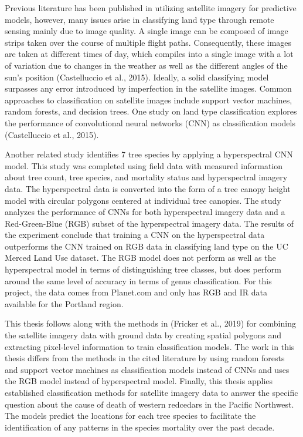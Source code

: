 \documentclass[12pt,twoside]{reedthesis}
\begin{document}
Previous literature has been published in utilizing satellite imagery for predictive models, however, many issues arise in classifying land type through remote sensing mainly due to image quality. A single image can be composed of image strips taken over the course of multiple flight paths. Consequently, these images are taken at different times of day, which compiles into a single image with a lot of variation due to changes in the weather as well as the different angles of the sun's position (Castelluccio et al., 2015). Ideally, a solid classifying model surpasses any error introduced by imperfection in the satellite images. Common approaches to classification on satellite images include support vector machines, random forests, and decision trees. One study on land type classification explores the performance of convolutional neural networks (CNN) as classification models (Castelluccio et al., 2015).

Another related study identifies 7 tree species by applying a hyperspectral CNN model. This study was completed using field data with measured information about tree count, tree species, and mortality status and hyperspectral imagery data. The hyperspectral data is converted into the form of a tree canopy height model with circular polygons centered at individual tree canopies. The study analyzes the performance of CNNs for both hyperspectral imagery data and a Red-Green-Blue (RGB) subset of the hyperspectral imagery data. The results of the experiment conclude that training a CNN on the hyperspectral data outperforms the CNN trained on RGB data in classifying land type on the UC Merced Land Use dataset. The RGB model does not perform as well as the hyperspectral model in terms of distinguishing tree classes, but does perform around the same level of accuracy in terms of genus classification. For this project, the data comes from Planet.com and only has RGB and IR data available for the Portland region.

This thesis follows along with the methods in (Fricker et al., 2019) for combining the satellite imagery data with ground data by creating spatial polygons and extracting pixel-level information to train classification models. The work in this thesis differs from the methods in the cited literature by using random forests and support vector machines as classification models instead of CNNs and uses the RGB model instead of hyperspectral model. Finally, this thesis applies established classification methods for satellite imagery data to answer the specific question about the cause of death of western redcedars in the Pacific Northwest. The models predict the locations for each tree species to facilitate the identification of any patterns in the species mortality over the past decade.
\end{document}

